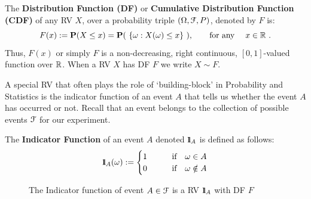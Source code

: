\begin{definition}\label{D:DF}
The {\bf Distribution Function (DF)} or {\bf Cumulative Distribution Function (CDF)} of any RV $X$, over a  probability triple $(\Omega, \mathcal{F},P)$, denoted by $F$ is:
\begin{equation}\label{E:DF}
F(x) := \mathbf{P}(X \leq x) = \mathbf{P}( \ \{\omega: X(\omega) \leq x\} \ ), \qquad \text{for any }\quad x \in \mathbb{R} \ .
\end{equation}
Thus, $F(x)$ or simply $F$ is a non-decreasing, right continuous, $[0,1]$-valued function over $\mathbb{R}$.  When a RV $X$ has DF $F$ we write $X \sim F$.
\end{definition}

A special RV that often plays the role of `building-block' in Probability and Statistics is the indicator function of an event $A$ that tells us whether the event $A$ has occurred or not.  Recall that an event belongs to the collection of possible events $\mathcal{F}$ for our experiment.
\begin{definition}
The {\bf Indicator Function} of an event $A$ denoted ${1}\mspace{-11 mu}{1}_A$ is defined as follows:
\begin{equation}
{1}\mspace{-11 mu}{1}_A(\omega) := 
\begin{cases}
1 & \qquad \text{if} \quad \omega \in A \\
0 & \qquad \text{if} \quad \omega \notin A
\end{cases}
\end{equation}
\end{definition}
\begin{figure}[htpb]
\caption{The Indicator function of event $A \in \mathcal{F}$ is a RV ${1}\mspace{-11 mu}{1}_A$ with DF $F$ \label{F:RVIndic}}
\centering   {}
\end{figure}
